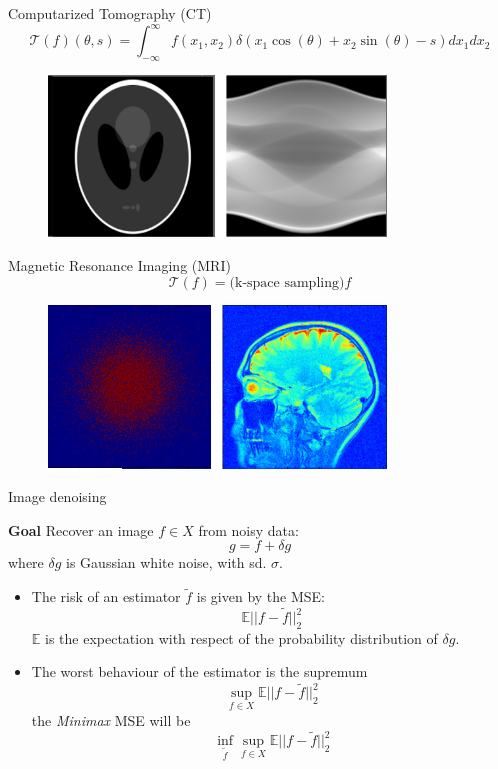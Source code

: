 \begin{frame}{Computarized Tomography (CT)}
$$
\mathcal{T}(f) (\theta,s) = \int_{-\infty}^{\infty}f(x_1,x_2)\delta(x_1\cos(\theta)+x_2\sin(\theta)-s)dx_1dx_2
$$

\begin{figure}
\centering
\includegraphics[width=0.8\textwidth]{./Images/CT.png}
\end{figure}
\end{frame}

\begin{frame}{Magnetic Resonance Imaging (MRI)}
$$
\mathcal{T}(f)= \text{(k-space sampling)} f
$$
\begin{figure}
\centering
\includegraphics[width=0.8\textwidth]{./Images/MRI.jpg}
\end{figure}
\end{frame}

\begin{frame}{Image denoising}
\begin{block}{\textbf{Goal}}
 Recover an image $f\in X$ from noisy data:
$$
g = f+\delta g
$$
where $\delta g$ is Gaussian white noise, with sd. $\sigma$.
\end{block}

\pause
\bigskip
\begin{itemize}
\item The risk of an estimator $\tilde{f}$ is given by the MSE:
$$
\mathbb{E}||f-\tilde{f}||_2^2
$$
$\mathbb{E}$ is the expectation with respect of the probability distribution of $\delta g$.
\pause
\bigskip
\item The worst behaviour of the estimator is the supremum
$$
\sup_{f\in X} \mathbb{E}||f-\tilde{f}||_2^2
$$
the \textit{Minimax} MSE will be
$$
\inf_{\tilde{f}}\sup_{f\in X}\mathbb{E}||f-\tilde{f}||^2_2
$$

\end{itemize}
\end{frame}

